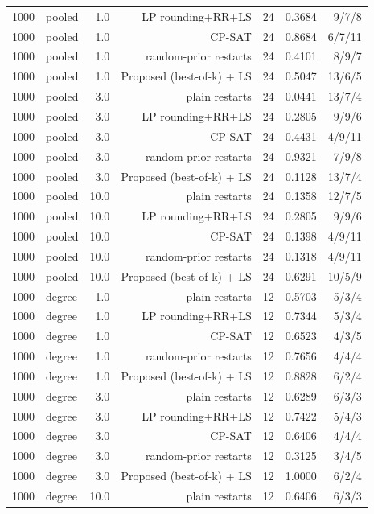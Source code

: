 \begin{table}[t]
\begin{tabular}{llrrrrr}
1000 & pooled & 1.0 & LP rounding+RR+LS & 24 & 0.3684 & 9/7/8 \\
1000 & pooled & 1.0 & CP-SAT & 24 & 0.8684 & 6/7/11 \\
1000 & pooled & 1.0 & random-prior restarts & 24 & 0.4101 & 8/9/7 \\
1000 & pooled & 1.0 & Proposed (best-of-k) + LS & 24 & 0.5047 & 13/6/5 \\
1000 & pooled & 3.0 & plain restarts & 24 & 0.0441 & 13/7/4 \\
1000 & pooled & 3.0 & LP rounding+RR+LS & 24 & 0.2805 & 9/9/6 \\
1000 & pooled & 3.0 & CP-SAT & 24 & 0.4431 & 4/9/11 \\
1000 & pooled & 3.0 & random-prior restarts & 24 & 0.9321 & 7/9/8 \\
1000 & pooled & 3.0 & Proposed (best-of-k) + LS & 24 & 0.1128 & 13/7/4 \\
1000 & pooled & 10.0 & plain restarts & 24 & 0.1358 & 12/7/5 \\
1000 & pooled & 10.0 & LP rounding+RR+LS & 24 & 0.2805 & 9/9/6 \\
1000 & pooled & 10.0 & CP-SAT & 24 & 0.1398 & 4/9/11 \\
1000 & pooled & 10.0 & random-prior restarts & 24 & 0.1318 & 4/9/11 \\
1000 & pooled & 10.0 & Proposed (best-of-k) + LS & 24 & 0.6291 & 10/5/9 \\
1000 & degree & 1.0 & plain restarts & 12 & 0.5703 & 5/3/4 \\
1000 & degree & 1.0 & LP rounding+RR+LS & 12 & 0.7344 & 5/3/4 \\
1000 & degree & 1.0 & CP-SAT & 12 & 0.6523 & 4/3/5 \\
1000 & degree & 1.0 & random-prior restarts & 12 & 0.7656 & 4/4/4 \\
1000 & degree & 1.0 & Proposed (best-of-k) + LS & 12 & 0.8828 & 6/2/4 \\
1000 & degree & 3.0 & plain restarts & 12 & 0.6289 & 6/3/3 \\
1000 & degree & 3.0 & LP rounding+RR+LS & 12 & 0.7422 & 5/4/3 \\
1000 & degree & 3.0 & CP-SAT & 12 & 0.6406 & 4/4/4 \\
1000 & degree & 3.0 & random-prior restarts & 12 & 0.3125 & 3/4/5 \\
1000 & degree & 3.0 & Proposed (best-of-k) + LS & 12 & 1.0000 & 6/2/4 \\
1000 & degree & 10.0 & plain restarts & 12 & 0.6406 & 6/3/3 \\

\end{tabular}
\end{table}
